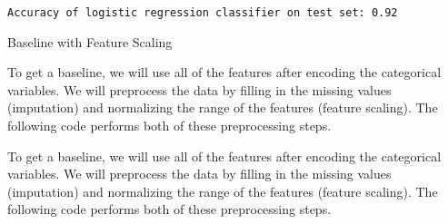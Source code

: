 \documentclass[11pt]{article}
\begin{document}
    \begin{Verbatim}[commandchars=\\\{\}]
Accuracy of logistic regression classifier on test set: 0.92

    \end{Verbatim}

    Baseline with Feature Scaling

     To get a baseline, we will use all of the features after encoding the
categorical variables. We will preprocess the data by filling in the
missing values (imputation) and normalizing the range of the features
(feature scaling). The following code performs both of these
preprocessing steps.

    To get a baseline, we will use all of the features after encoding the
categorical variables. We will preprocess the data by filling in the
missing values (imputation) and normalizing the range of the features
(feature scaling). The following code performs both of these
preprocessing steps.
\end{document}
